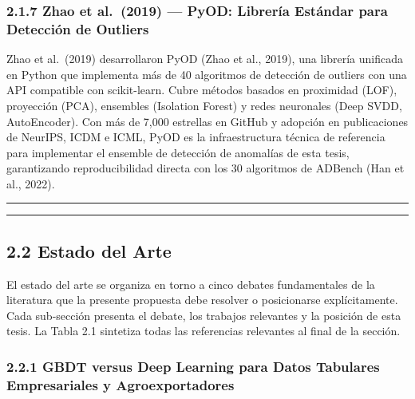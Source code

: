 \subsubsection{2.1.7 Zhao et al.~(2019) --- PyOD: Librería Estándar para
Detección de
Outliers}\label{zhao-et-al.-2019-pyod-libreruxeda-estuxe1ndar-para-detecciuxf3n-de-outliers}

Zhao et al.~(2019) desarrollaron PyOD (Zhao et al., 2019), una librería
unificada en Python que implementa más de 40 algoritmos de detección de
outliers con una API compatible con scikit-learn. Cubre métodos basados
en proximidad (LOF), proyección (PCA), ensembles (Isolation Forest) y
redes neuronales (Deep SVDD, AutoEncoder). Con más de 7,000 estrellas en
GitHub y adopción en publicaciones de NeurIPS, ICDM e ICML, PyOD es la
infraestructura técnica de referencia para implementar el ensemble de
detección de anomalías de esta tesis, garantizando reproducibilidad
directa con los 30 algoritmos de ADBench (Han et al., 2022).

\begin{center}\rule{0.5\linewidth}{0.5pt}\end{center}

\begin{center}\rule{0.5\linewidth}{0.5pt}\end{center}

\subsection{2.2 Estado del Arte}\label{estado-del-arte}

El estado del arte se organiza en torno a cinco debates fundamentales de
la literatura que la presente propuesta debe resolver o posicionarse
explícitamente. Cada sub-sección presenta el debate, los trabajos
relevantes y la posición de esta tesis. La Tabla 2.1 sintetiza todas las
referencias relevantes al final de la sección.

\subsubsection{2.2.1 GBDT versus Deep Learning para Datos Tabulares
Empresariales y
Agroexportadores}\label{gbdt-versus-deep-learning-para-datos-tabulares-empresariales-y-agroexportadores}

